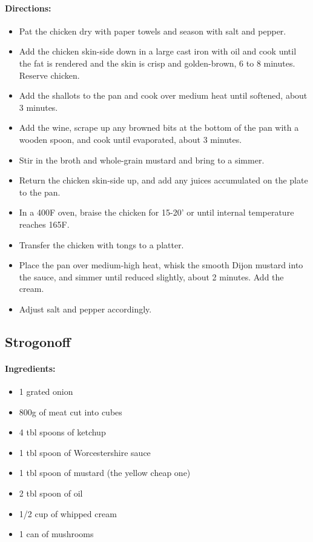 \documentclass{article}
\begin{document}
\paragraph{Directions:}
\begin{itemize}
	\item Pat the chicken dry with paper towels and season with salt and pepper.
	\item Add the chicken skin-side down in a large cast iron with oil and cook until the fat is rendered and the skin is crisp and golden-brown, 6 to 8 minutes. Reserve chicken.
	\item Add the shallots to the pan and cook over medium heat until softened, about 3 minutes.
	\item Add the wine, scrape up any browned bits at the bottom of the pan with a wooden spoon, and cook until evaporated, about 3 minutes.
	\item Stir in the broth and whole-grain mustard and bring to a simmer.
	\item Return the chicken skin-side up, and add any juices accumulated on the plate to the pan.
	\item In a 400F oven, braise the chicken for 15-20’ or until internal temperature reaches 165F.
	\item Transfer the chicken with tongs to a platter.
	\item Place the pan over medium-high heat, whisk the smooth Dijon mustard into the sauce, and simmer until reduced slightly, about 2 minutes. Add the cream.
	\item Adjust salt and pepper accordingly.	
\end{itemize}

\subsection{Strogonoff}

\paragraph{Ingredients:}

\begin{itemize}
	\item 1 grated onion
	\item 800g of meat cut into cubes
	\item 4 tbl spoons of ketchup
	\item 1 tbl spoon of Worcestershire sauce
	\item 1 tbl spoon of mustard (the yellow cheap one)
	\item 2 tbl spoon of oil
	\item 1/2 cup of whipped cream
	\item 1 can of mushrooms
\end{itemize}
\end{document}
